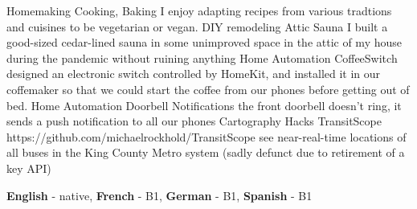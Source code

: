 \documentclass[9pt]{developercv} %
\begin{document}
\begin{entrylist}
    \entry
		{Homemaking}
		{Cooking, Baking}
		{}
		{I enjoy adapting recipes from various tradtions and cuisines to be vegetarian or vegan.}
    \entry
		{DIY remodeling}
		{Attic Sauna}
		{}
		{I built a good-sized cedar-lined sauna in some unimproved space in the attic of my house during the pandemic without ruining anything}
    \entry
		{Home Automation}
		{CoffeeSwitch}
		{}
		{designed an electronic switch controlled by HomeKit, and installed it in our coffemaker so that we could start the coffee from our phones before getting out of bed.}
    \entry
		{Home Automation}
		{Doorbell Notifications}
		{}
		{the front doorbell doesn’t ring, it sends a push notification to all our phones}
    \entry
		{Cartography Hacks}
		{TransitScope}
		{https://github.com/michaelrockhold/TransitScope}
		{see near-real-time locations of all buses in the King County Metro system (sadly defunct due to retirement of a key API)}
\end{entrylist}

\vspace{-10 pt}
    \vspace{-6pt}
    
    \hspace{26mm} \textbf{English} - native, \textbf{ French} - B1, \textbf{ German} - B1, \textbf{ Spanish} - B1

\end{document}
